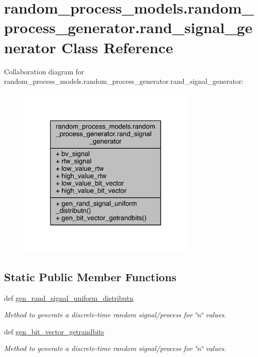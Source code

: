 \hypertarget{classrandom__process__models_1_1random__process__generator_1_1rand__signal__generator}{}\section{random\+\_\+process\+\_\+models.\+random\+\_\+process\+\_\+generator.\+rand\+\_\+signal\+\_\+generator Class Reference}
\label{classrandom__process__models_1_1random__process__generator_1_1rand__signal__generator}


Collaboration diagram for random\+\_\+process\+\_\+models.\+random\+\_\+process\+\_\+generator.\+rand\+\_\+signal\+\_\+generator\+:
\nopagebreak
\begin{figure}[H]
\begin{center}
\leavevmode
\includegraphics[width=244pt]{d8/df9/classrandom__process__models_1_1random__process__generator_1_1rand__signal__generator__coll__graph}
\end{center}
\end{figure}
\subsection*{Static Public Member Functions}
\begin{DoxyCompactItemize}
\item 
def \hyperlink{classrandom__process__models_1_1random__process__generator_1_1rand__signal__generator_a0120f8a5803679907bca0d8267e30781}{gen\+\_\+rand\+\_\+signal\+\_\+uniform\+\_\+distributn}
\begin{DoxyCompactList}\small\item\em Method to generate a discrete-\/time random signal/process for \char`\"{}n\char`\"{} values. \end{DoxyCompactList}\item 
def \hyperlink{classrandom__process__models_1_1random__process__generator_1_1rand__signal__generator_a281d575afed0d10531c7cfaf17df2f5a}{gen\+\_\+bit\+\_\+vector\+\_\+getrandbits}
\begin{DoxyCompactList}\small\item\em Method to generate a discrete-\/time random signal/process for \char`\"{}n\char`\"{} values. \end{DoxyCompactList}\end{DoxyCompactItemize}
